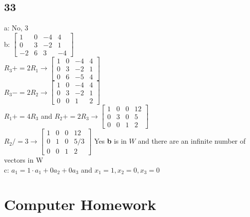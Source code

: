 \documentclass{article}
\begin{document}
\subsection*{33}
a: No, 3
\\b: 
$
\begin{bmatrix}
1 & 0 & -4 & 4 \\
0 & 3 & -2 & 1 \\
-2 & 6 & 3 & -4
\end{bmatrix}
$
\\$R_3+=2R_1 \rightarrow \begin{bmatrix}
    1 & 0 & -4 & 4 \\
    0 & 3 & -2 & 1 \\
    0 & 6 & -5 & 4
    \end{bmatrix}$ \\[0.1in]$R_3-=2R_2 \rightarrow
    \begin{bmatrix}
        1 & 0 & -4 & 4 \\
        0 & 3 & -2 & 1 \\
        0 & 0 & 1 & 2
        \end{bmatrix}
    $\\[0.1in]$R_1+=4R_3$ and $R_2+=2R_3 \rightarrow
    \begin{bmatrix}
        1 & 0 & 0 & 12 \\
        0 & 3 & 0 & 5 \\
        0 & 0 & 1 & 2
        \end{bmatrix}
    $ \\$R_2 /= 3 \rightarrow \begin{bmatrix}
        1 & 0 & 0 & 12 \\
        0 & 1 & 0 & 5/3 \\
        0 & 0 & 1 & 2
        \end{bmatrix}$ Yes \textbf{b} is in $W$ and there are an infinite number of vectors in W
\\c: $a_1=1\cdot a_1+ 0a_2 + 0a_3$ and $x_1=1, x_2=0,x_3=0$ \checkmark \pagebreak
\section*{Computer Homework}
\end{document}
